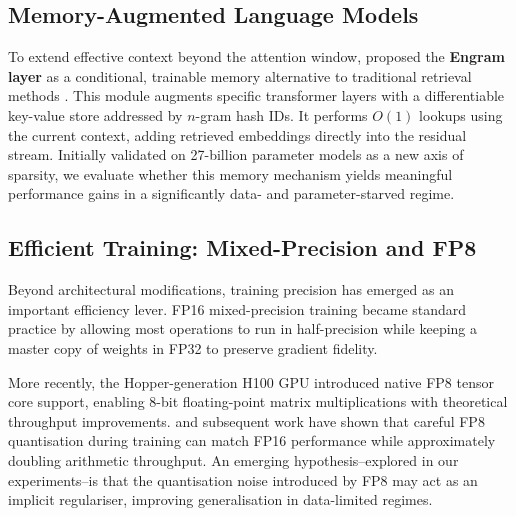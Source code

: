 \subsection{Memory-Augmented Language Models}To extend effective context beyond the attention window, \textcite{cheng2026conditional} proposed the \textbf{Engram layer} as a conditional, trainable memory alternative to traditional retrieval methods \parencite{lewis2020rag}. This module augments specific transformer layers with a differentiable key-value store addressed by \(n\)-gram hash IDs. It performs $O(1)$ lookups using the current context, adding retrieved embeddings directly into the residual stream. Initially validated on 27-billion parameter models as a new axis of sparsity, we evaluate whether this memory mechanism yields meaningful performance gains in a significantly data- and parameter-starved regime.

\subsection{Efficient Training: Mixed-Precision and FP8}

Beyond architectural modifications, training precision has emerged as an important efficiency
lever. FP16 mixed-precision training \parencite{micikevicius2018mixed} became standard practice by allowing most operations to run in half-precision while keeping a master copy of weights in FP32 to preserve gradient fidelity.

More recently, the Hopper-generation H100 GPU introduced native FP8 tensor core support, enabling 8-bit floating-point matrix multiplications with theoretical throughput improvements.
\textcite{peng2023fp8} and subsequent work have shown that careful FP8 quantisation during
training can match FP16 performance while approximately doubling arithmetic throughput.
An emerging hypothesis--explored in our experiments--is that the quantisation noise introduced by FP8 may act as an implicit regulariser, improving generalisation in data-limited regimes.


